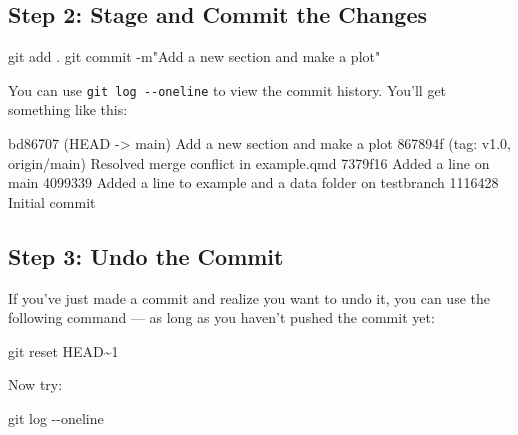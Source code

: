 \documentclass[
  11pt,
  letterpaper,
  DIV=11,
  numbers=noendperiod]{scrartcl}
\newenvironment{Shaded}{\begin{snugshade}}{\end{snugshade}}
\newcommand{\AttributeTok}[1]{\textcolor[rgb]{0.40,0.45,0.13}{#1}}
\newcommand{\FunctionTok}[1]{\textcolor[rgb]{0.28,0.35,0.67}{#1}}
\newcommand{\NormalTok}[1]{\textcolor[rgb]{0.00,0.23,0.31}{#1}}
\newcommand{\StringTok}[1]{\textcolor[rgb]{0.13,0.47,0.30}{#1}}
\let\textttOrig\texttt
\renewcommand{\texttt}[1]{\textttOrig{\colorbox{codebggray}{\textcolor{codefontcolor}{#1}}}}
\begin{document}
\subsection{Step 2: Stage and Commit the
Changes}\label{step-2-stage-and-commit-the-changes}

\begin{Shaded}
\begin{Highlighting}[]
\FunctionTok{git}\NormalTok{ add .}
\FunctionTok{git}\NormalTok{ commit }\AttributeTok{{-}m}\StringTok{"Add a new section and make a plot"}
\end{Highlighting}
\end{Shaded}

You can use \texttt{git\ log\ -\/-oneline} to view the commit history.
You'll get something like this:

\begin{Shaded}
\begin{Highlighting}[]
\NormalTok{bd86707 (HEAD {-}\textgreater{} main) Add a new section and make a plot}
\NormalTok{867894f (tag: v1.0, origin/main) Resolved merge conflict in example.qmd}
\NormalTok{7379f16 Added a line on main}
\NormalTok{4099339 Added a line to example and a data folder on testbranch}
\NormalTok{1116428 Initial commit}
\end{Highlighting}
\end{Shaded}

\subsection{Step 3: Undo the Commit}\label{step-3-undo-the-commit}

If you've just made a commit and realize you want to undo it, you can
use the following command --- as long as you haven't pushed the commit
yet:

\begin{Shaded}
\begin{Highlighting}[]
\FunctionTok{git}\NormalTok{ reset HEAD\textasciitilde{}1}
\end{Highlighting}
\end{Shaded}

Now try:

\begin{Shaded}
\begin{Highlighting}[]
\FunctionTok{git}\NormalTok{ log }\AttributeTok{{-}{-}oneline}
\end{Highlighting}
\end{Shaded}
\end{document}
